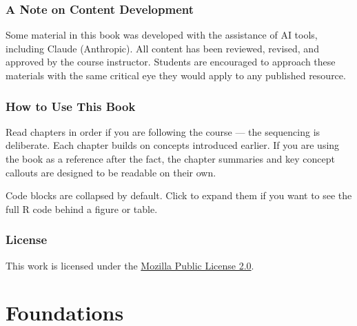 \documentclass[
  11pt,
  letterpaper,
]{scrbook}
\begin{document}
\section*{A Note on Content
Development}\label{a-note-on-content-development}


Some material in this book was developed with the assistance of AI
tools, including Claude (Anthropic). All content has been reviewed,
revised, and approved by the course instructor. Students are encouraged
to approach these materials with the same critical eye they would apply
to any published resource.

\section*{How to Use This Book}\label{how-to-use-this-book}


Read chapters in order if you are following the course --- the
sequencing is deliberate. Each chapter builds on concepts introduced
earlier. If you are using the book as a reference after the fact, the
chapter summaries and key concept callouts are designed to be readable
on their own.

Code blocks are collapsed by default. Click to expand them if you want
to see the full R code behind a figure or table.

\section*{License}\label{license}


This work is licensed under the
\href{https://www.mozilla.org/en-US/MPL/2.0/}{Mozilla Public License
2.0}.

\part{Foundations}

\chapter{}\label{section}

\chapter{}\label{section-1}
\end{document}
